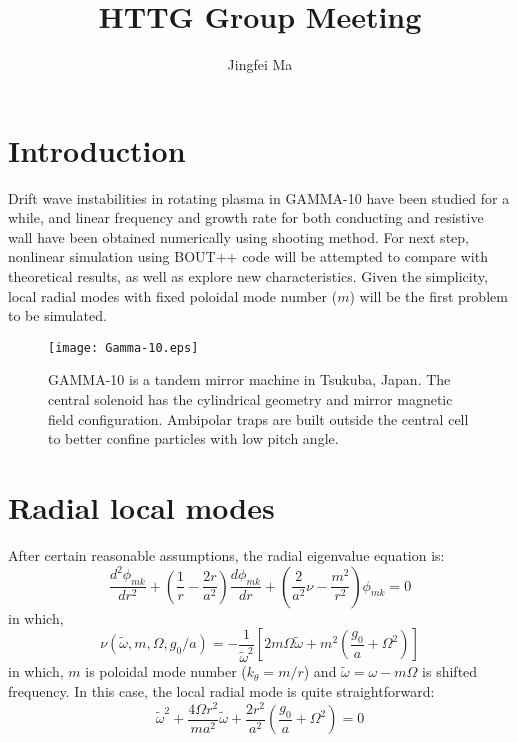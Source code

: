 \documentclass{article}
\title{HTTG Group Meeting}
\author{Jingfei Ma}
\begin{document}
\maketitle
\section{Introduction}
Drift wave instabilities in rotating plasma in GAMMA-10 have been studied for a while, and linear frequency and growth rate for both conducting and resistive wall have been obtained numerically using shooting method. For next step, nonlinear simulation using BOUT++ code will be attempted to compare with theoretical results, as well as explore new characteristics. Given the simplicity, local radial modes with fixed poloidal mode number ($m$) will be the first problem to be simulated.

\begin{figure}[ht]
\centering
\texttt{[image: Gamma-10.eps]}
\caption{GAMMA-10 is a tandem mirror machine in Tsukuba, Japan. The central solenoid has the cylindrical geometry and mirror magnetic field configuration. Ambipolar traps are built outside the central cell to better confine particles with low pitch angle.}
\end{figure}
\section{Radial local modes}
After certain reasonable assumptions, the radial eigenvalue equation is:
\begin{equation}
\frac{d^2\phi_{mk}}{d r^2}+\left(\frac{1}{r}-\frac{2 r}{a^2}\right)\frac{d\phi_{mk}}{d r}+\left(\frac{2}{a^2}\nu-\frac{m^2}{r^2}\right)\phi_{mk}=0
\label{eq1}
\end{equation}
in which,
\begin{equation}
\nu (\tilde{\omega},m,\Omega,g_0/a)=-\frac{1}{\tilde{\omega}^2}\left[2m\Omega\tilde{\omega}+m^2\left(\frac{g_0}{a}+\Omega^2\right)\right]
\label{eq2}
\end{equation}
in which, $m$ is poloidal mode number ($k_\theta=m/r$) and $\tilde{\omega}=\omega-m\Omega$ is shifted frequency. In this case, the local radial mode is quite straightforward:
\begin{equation}
\tilde{\omega}^2+\frac{4\Omega r^2}{m a^2}\tilde{\omega}+\frac{2 r^2}{a^2}\left(\frac{g_0}{a}+\Omega^2\right)=0
\label{eq3}
\end{equation}
\end{document}
